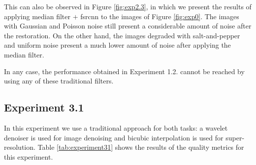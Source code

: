 This can also be observed in Figure \ref{fig:exp2.3}, in which we present the results of applying median filter $+$ \gls{fsrcnn} to the images of Figure \ref{fig:exp0}. The images with Gaussian and Poisson noise still present a considerable amount of noise after the restoration. On the other hand, the images degraded with salt-and-pepper and uniform noise present a much lower amount of noise after applying the median filter. 

In any case, the performance obtained in Experiment 1.2. cannot be reached by using any of these traditional filters.

\newpage\subsection{Experiment 3.1}
In this experiment we use a traditional approach for both tasks: a wavelet denoiser is used for image denoising and bicubic interpolation is used for super-resolution. Table \ref{tab:experiment31} shows the results of the quality metrics for this experiment.

